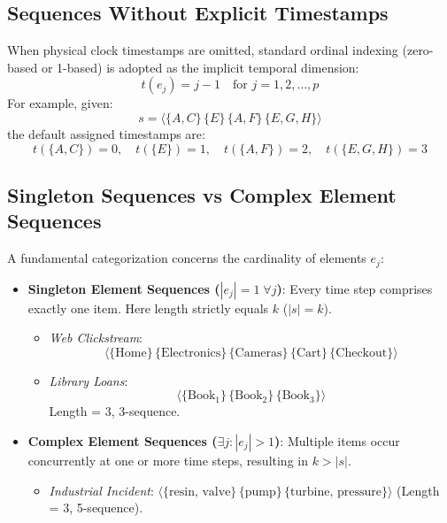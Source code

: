 \subsection{Sequences Without Explicit Timestamps}
When physical clock timestamps are omitted, standard ordinal indexing (zero-based or 1-based) is adopted as the implicit temporal dimension:
\begin{equation}
t(e_j) = j - 1 \quad \text{for } j = 1, 2, \dots, p
\end{equation}
For example, given:
\begin{equation}
s = \langle \{A, C\} \, \{E\} \, \{A, F\} \, \{E, G, H\} \rangle
\end{equation}
the default assigned timestamps are:
\begin{equation*}
t(\{A, C\}) = 0, \quad t(\{E\}) = 1, \quad t(\{A, F\}) = 2, \quad t(\{E, G, H\}) = 3
\end{equation*}

\subsection{Singleton Sequences vs Complex Element Sequences}
A fundamental categorization concerns the cardinality of elements $e_j$:
\begin{itemize}
    \item \textbf{Singleton Element Sequences ($|e_j| = 1 \; \forall j$)}: Every time step comprises exactly one item. Here length strictly equals $k$ ($|s| = k$).
    \begin{itemize}
        \item \textit{Web Clickstream}:
        \begin{equation*}
        \langle \{\text{Home}\} \, \{\text{Electronics}\} \, \{\text{Cameras}\} \, \{\text{Cart}\} \, \{\text{Checkout}\} \rangle
        \end{equation*}
        \item \textit{Library Loans}:
        \begin{equation*}
        \langle \{\text{Book}_1\} \, \{\text{Book}_2\} \, \{\text{Book}_3\} \rangle
        \end{equation*}
        Length = 3, 3-sequence.
    \end{itemize}
    \item \textbf{Complex Element Sequences ($\exists j : |e_j| > 1$)}: Multiple items occur concurrently at one or more time steps, resulting in $k > |s|$.
    \begin{itemize}
        \item \textit{Industrial Incident}: $\langle \{\text{resin, valve}\} \, \{\text{pump}\} \, \{\text{turbine, pressure}\} \rangle$ (Length = 3, 5-sequence).
    \end{itemize}
\end{itemize}

